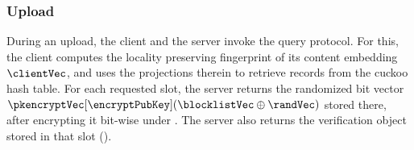 


 

\subsubsection{Upload}
%
During an upload, the client and the server invoke the \protocolFMP query protocol. For this, the client computes the locality preserving fingerprint 
of its content embedding $\clientVec$, and uses the projections therein to retrieve records from the cuckoo hash table. For each requested slot, the server returns the randomized bit vector $\pkencryptVec[\encryptPubKey](\blocklistVec \oplus \randVec)$ stored there, after encrypting it bit-wise under \encryptPubKey. The server also returns the verification object stored in that slot (). 





